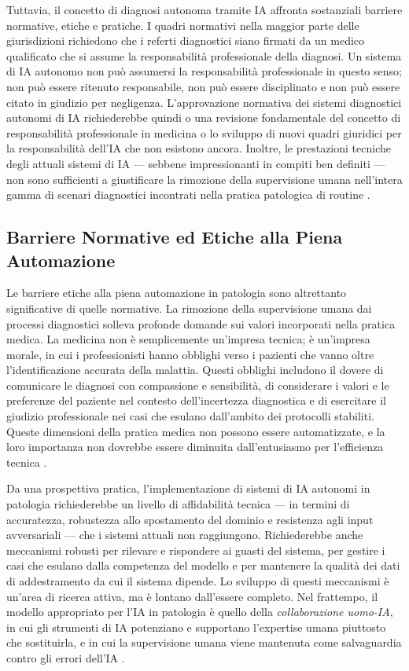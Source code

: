Tuttavia, il concetto di diagnosi autonoma tramite IA affronta sostanziali barriere normative, etiche e pratiche. I quadri normativi nella maggior parte delle giurisdizioni richiedono che i referti diagnostici siano firmati da un medico qualificato che si assume la responsabilità professionale della diagnosi. Un sistema di IA autonomo non può assumersi la responsabilità professionale in questo senso; non può essere ritenuto responsabile, non può essere disciplinato e non può essere citato in giudizio per negligenza. L'approvazione normativa dei sistemi diagnostici autonomi di IA richiederebbe quindi o una revisione fondamentale del concetto di responsabilità professionale in medicina o lo sviluppo di nuovi quadri giuridici per la responsabilità dell'IA che non esistono ancora. Inoltre, le prestazioni tecniche degli attuali sistemi di IA — sebbene impressionanti in compiti ben definiti — non sono sufficienti a giustificare la rimozione della supervisione umana nell'intera gamma di scenari diagnostici incontrati nella pratica patologica di routine \cite{zhang2023}.

\subsection{Barriere Normative ed Etiche alla Piena Automazione}

Le barriere etiche alla piena automazione in patologia sono altrettanto significative di quelle normative. La rimozione della supervisione umana dai processi diagnostici solleva profonde domande sui valori incorporati nella pratica medica. La medicina non è semplicemente un'impresa tecnica; è un'impresa morale, in cui i professionisti hanno obblighi verso i pazienti che vanno oltre l'identificazione accurata della malattia. Questi obblighi includono il dovere di comunicare le diagnosi con compassione e sensibilità, di considerare i valori e le preferenze del paziente nel contesto dell'incertezza diagnostica e di esercitare il giudizio professionale nei casi che esulano dall'ambito dei protocolli stabiliti. Queste dimensioni della pratica medica non possono essere automatizzate, e la loro importanza non dovrebbe essere diminuita dall'entusiasmo per l'efficienza tecnica \cite{hanna2024}.

Da una prospettiva pratica, l'implementazione di sistemi di IA autonomi in patologia richiederebbe un livello di affidabilità tecnica — in termini di accuratezza, robustezza allo spostamento del dominio e resistenza agli input avversariali — che i sistemi attuali non raggiungono. Richiederebbe anche meccanismi robusti per rilevare e rispondere ai guasti del sistema, per gestire i casi che esulano dalla competenza del modello e per mantenere la qualità dei dati di addestramento da cui il sistema dipende. Lo sviluppo di questi meccanismi è un'area di ricerca attiva, ma è lontano dall'essere completo. Nel frattempo, il modello appropriato per l'IA in patologia è quello della \emph{collaborazione uomo-IA}, in cui gli strumenti di IA potenziano e supportano l'expertise umana piuttosto che sostituirla, e in cui la supervisione umana viene mantenuta come salvaguardia contro gli errori dell'IA \cite{song2023}.

